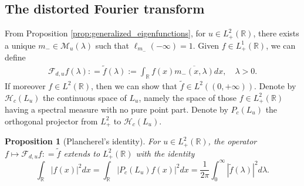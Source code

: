 \documentclass[10pt]{article}
\newtheorem{proposition}[theorem]{Proposition}
\numberwithin{equation}{section}
\numberwithin{theorem}{section}
\begin{document}
\subsection{The distorted Fourier transform}\label{sec 2.2}
From Proposition \ref{prop:generalized_eigenfunctions}, for $u \in L_{+}^{2}(\mathbb R)$, there exists a
unique $m_{-} \in \mathscr{M}_u(\lambda)$ such that $\ell_{m_{-}}(-\infty)=1$. Given $f \in L_{+}^1(\mathbb{R})$, we can define
\begin{align*}
\mathcal{F}_{d,u} f (\lambda) : = \widetilde{f}(\lambda):=\int_{\mathbb{R}} f(x) \overline{m_{-}(x, \lambda)} d x, \quad \lambda > 0.
\end{align*}
If moreover $f \in L^2(\mathbb{R})$, then we can show that $\widetilde{f} \in L^2((0,+\infty))$. Denote by $\mathcal{H}_c\left(L_u\right)$ the continuous space of $L_u$, namely the space of those $f \in L_{+}^2(\mathbb{R})$ having a spectral measure with no pure point part. Denote by $P_c(L_u)$ the orthogonal projector from $L_{+}^2$ to $\mathcal{H}_c\left(L_u\right)$.
\begin{proposition}[Plancherel's identity]
\label{prop 2.6}
For $u \in L_{+}^{2}(\mathbb R)$, the operator $f \mapsto \mathcal{F}_{d,u} f: = \widetilde{f}$ extends to $L_{+}^2(\mathbb{R})$ with the identity
\begin{equation}
\label{3.3}
\int_{\mathbb{R}}\left|f(x)\right|^2 d x= \int_{\mathbb{R}}\left|P_c(L_u) f(x)\right|^2 d x=\frac{1}{2 \pi} \int_0^{\infty}|\widetilde{f}(\lambda)|^2 d \lambda.
\end{equation}
\end{proposition}
\end{document}
